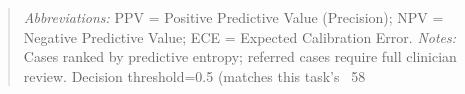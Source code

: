 \begin{quote}\small
\textit{Abbreviations:} PPV = Positive Predictive Value (Precision); NPV = Negative Predictive Value; ECE = Expected Calibration Error.
\textit{Notes:} Cases ranked by predictive entropy; referred cases require full clinician review. Decision threshold=0.5 (matches this task's ~58%
\end{quote}